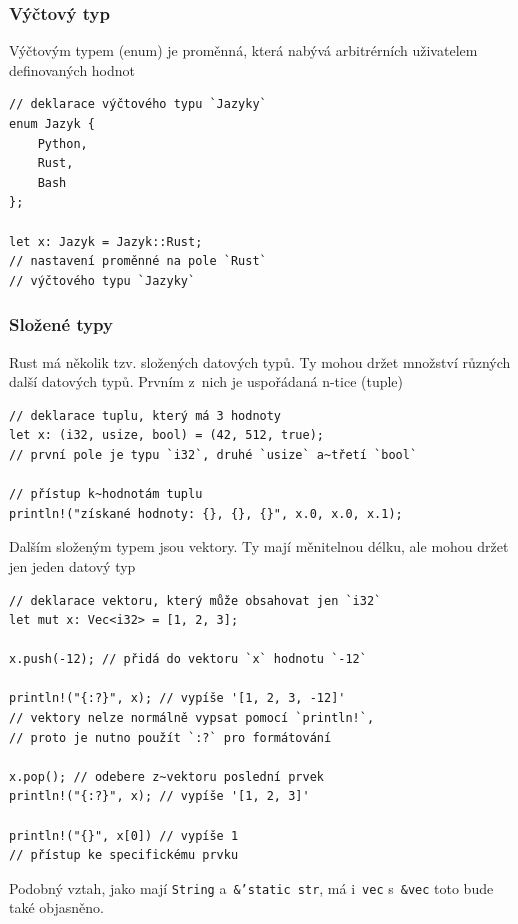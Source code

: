 \documentclass[a4paper, 12pt]{article} %
\newcommand{\rust}[1]{\texttt{#1}}
\begin{document}
		\subsubsection*{Výčtový typ}
			Výčtovým typem (enum) je proměnná, která nabývá arbitrérních uživatelem definovaných hodnot
			\begin{verbatim}
// deklarace výčtového typu `Jazyky`
enum Jazyk {
	Python,
	Rust,
	Bash
};

let x: Jazyk = Jazyk::Rust;
// nastavení proměnné na pole `Rust`
// výčtového typu `Jazyky`
			\end{verbatim}


		\subsubsection*{Složené typy}
			Rust má několik tzv. složených datových typů. Ty mohou držet množství různých další datových typů. Prvním z~nich je uspořádaná n-tice (tuple)

			\begin{verbatim}
// deklarace tuplu, který má 3 hodnoty
let x: (i32, usize, bool) = (42, 512, true);
// první pole je typu `i32`, druhé `usize` a~třetí `bool`

// přístup k~hodnotám tuplu
println!("získané hodnoty: {}, {}, {}", x.0, x.0, x.1);
			\end{verbatim}
		
			Dalším složeným typem jsou vektory. Ty mají měnitelnou délku, ale mohou držet jen jeden datový typ
			\begin{verbatim}
// deklarace vektoru, který může obsahovat jen `i32`
let mut x: Vec<i32> = [1, 2, 3];

x.push(-12); // přidá do vektoru `x` hodnotu `-12`

println!("{:?}", x); // vypíše '[1, 2, 3, -12]'
// vektory nelze normálně vypsat pomocí `println!`,
// proto je nutno použít `:?` pro formátování

x.pop(); // odebere z~vektoru poslední prvek
println!("{:?}", x); // vypíše '[1, 2, 3]'

println!("{}", x[0]) // vypíše 1
// přístup ke specifickému prvku
			\end{verbatim}
		
			Podobný vztah, jako mají \rust{String} a~\rust{&'static str}, má i~\rust{vec} s~\rust{&vec} toto bude také objasněno.
		
\end{document}
